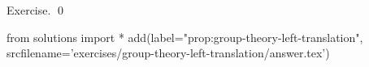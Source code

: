 
\begin{prop}
  \label{prop:group-theory-left-translation}
  
\end{prop}
\proof
Exercise.
\qed
\begin{python0}
from solutions import *
add(label="prop:group-theory-left-translation",
    srcfilename='exercises/group-theory-left-translation/answer.tex') 
\end{python0}
